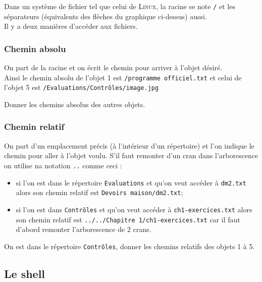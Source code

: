 	Dans un système de fichier tel que celui de \textsc{Linux}, la racine se note \texttt{/} et les séparateurs (équivalents des flèches du graphique ci-dessus) aussi.\\
	Il y a deux manières d'accéder aux fichiers.
	\subsubsection{Chemin absolu}
	On part de la racine et on écrit le chemin pour arriver à l'objet désiré.\\
	Ainsi le chemin absolu de l'objet 1 est \texttt{/programme officiel.txt} et celui de l'objet 5 est \texttt{/Evaluations/Contrôles/image.jpg}
	
	\begin{exercice}[]
		Donner les chemins absolus des autres objets.
	\end{exercice}

	

	\subsubsection{Chemin relatif}
	On part d'un emplacement précis (à l'intérieur d'un répertoire) et l'on indique le chemin pour aller à l'objet voulu. S'il faut remonter d'un cran dans l'arborescence on utilise na notation \texttt{..} comme ceci :
	\begin{itemize}
		\item 	si l'on est dans le répertoire \texttt{Evaluations} et qu'on veut accéder à \texttt{dm2.txt} alors son chemin relatif est \texttt{Devoirs maison/dm2.txt};
		\item 	si l'on est dans \texttt{Contrôles} et qu'on veut accéder à \texttt{ch1-exercices.txt} alors son chemin relatif est \texttt{../../Chapitre 1/ch1-exercices.txt} car il faut d'abord remonter l'arborescence de 2 crans.
	\end{itemize}

	\begin{exercice}[]
		On est dans le répertoire \texttt{Contrôles}, donner les chemins relatifs des objets 1 à 5.
	\end{exercice}
	
	\subsection{Le shell}
	
